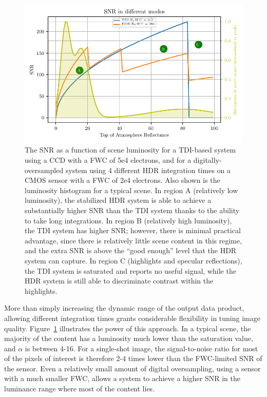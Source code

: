 \documentclass[]{spieman}  %
\begin{document}
\begin{figure}
  \centering
  \includegraphics[]{figures/snr_vs_L.pdf}
  \caption{The SNR as a function of scene luminosity for a TDI-based system using a CCD with a FWC of 5e4 electrons, and for a digitally-oversampled system using 4 different HDR integration times on a CMOS sensor with a FWC of 2e4 electrons. Also shown is the luminosity histogram for a typical scene. In region A (relatively low luminosity), the stabilized HDR system is able to achieve a substantially higher SNR than the TDI system thanks to the ability to take long integrations. In region B (relatively high luminosity), the TDI system has higher SNR; however, there is minimal practical advantage, since there is relatively little scene content in this regime, and the extra SNR is above the “good enough” level that the HDR system can capture. In region C (highlights and specular reflections), the TDI system is saturated and reports no useful signal, while the HDR system is still able to discriminate contrast within the highlights. \label{fig:snr_vs_L}}
\end{figure}

More than simply increasing the dynamic range of the output data product, allowing different integration times grants considerable flexibility in tuning image quality. Figure~\ref{fig:snr_vs_L} illustrates the power of this approach. In a typical scene, the majority of the content has a luminosity much lower than the saturation value, and $\alpha$ is between 4-16. For a single-shot image, the signal-to-noise ratio for most of the pixels of interest is therefore 2-4 times lower than the FWC-limited SNR of the sensor. Even a relatively small amount of digital oversampling, using a sensor with a much smaller FWC, allows a system to achieve a higher SNR in the luminance range where most of the content lies. 
\end{document}
